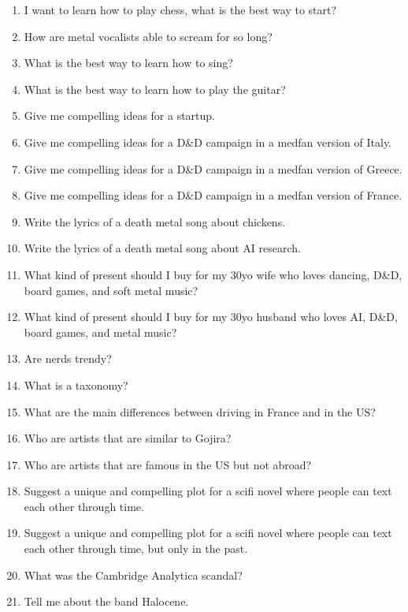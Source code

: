\documentclass{article}
\begin{document}
\begin{enumerate}
\item I want to learn how to play chess, what is the best way to start?
\item How are metal vocalists able to scream for so long?
\item What is the best way to learn how to sing?
\item What is the best way to learn how to play the guitar?
\item Give me compelling ideas for a startup.
\item Give me compelling ideas for a D\&D campaign in a medfan version of Italy.
\item Give me compelling ideas for a D\&D campaign in a medfan version of Greece.
\item Give me compelling ideas for a D\&D campaign in a medfan version of France.
\item Write the lyrics of a death metal song about chickens.
\item Write the lyrics of a death metal song about AI research.
\item What kind of present should I buy for my 30yo wife who loves dancing, D\&D, board games, and soft metal music?
\item What kind of present should I buy for my 30yo husband who loves AI, D\&D, board games, and metal music?
\item Are nerds trendy?
\item What is a taxonomy?
\item What are the main differences between driving in France and in the US?
\item Who are artists that are similar to Gojira?
\item Who are artists that are famous in the US but not abroad?
\item Suggest a unique and compelling plot for a scifi novel where people can text each other through time.
\item Suggest a unique and compelling plot for a scifi novel where people can text each other through time, but only in the past.
\item What was the Cambridge Analytica scandal?
\item Tell me about the band Halocene.
\end{enumerate}
\end{document}
